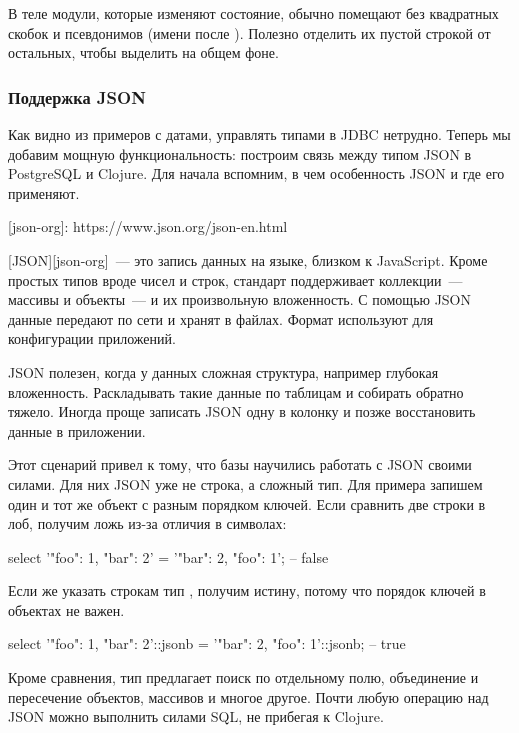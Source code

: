 В теле  модули, которые изменяют состояние, обычно помещают без квадратных скобок и псевдонимов (имени после ). Полезно отделить их пустой строкой от остальных, чтобы выделить на общем фоне.

\subsubsection{Поддержка JSON}

Как видно из примеров с датами, управлять типами в JDBC нетрудно. Теперь мы добавим мощную функциональность: построим связь между типом JSON в PostgreSQL и Clojure. Для начала вспомним, в чем особенность JSON и где его применяют.

[json-org]: https://www.json.org/json-en.html

[JSON][json-org]~--- это запись данных на языке, близком к JavaScript. Кроме простых типов вроде чисел и строк, стандарт поддерживает коллекции~--- массивы и объекты~--- и их произвольную вложенность. С помощью JSON данные передают по сети и хранят в файлах. Формат используют для конфигурации приложений.

JSON полезен, когда у данных сложная структура, например глубокая вложенность. Раскладывать такие данные по таблицам и собирать обратно тяжело. Иногда проще записать JSON одну в колонку и позже восстановить данные в приложении.

Этот сценарий привел к тому, что базы научились работать с JSON своими силами. Для них JSON уже не строка, а сложный тип. Для примера запишем один и тот же объект с разным порядком ключей. Если сравнить две строки в лоб, получим ложь из-за отличия в символах:

\begin{english}
  \begin{sql}
select '{"foo": 1, "bar": 2}' = '{"bar": 2, "foo": 1}';
-- false
  \end{sql}
\end{english}

Если же указать строкам тип , получим истину, потому что порядок ключей в объектах не важен.

\begin{english}
  \begin{sql}
select '{"foo": 1, "bar": 2}'::jsonb = '{"bar": 2, "foo": 1}'::jsonb;
-- true
  \end{sql}
\end{english}

Кроме сравнения, тип  предлагает поиск по отдельному полю, объединение и пересечение объектов, массивов и многое другое. Почти любую операцию над JSON можно выполнить силами SQL, не прибегая к Clojure.

